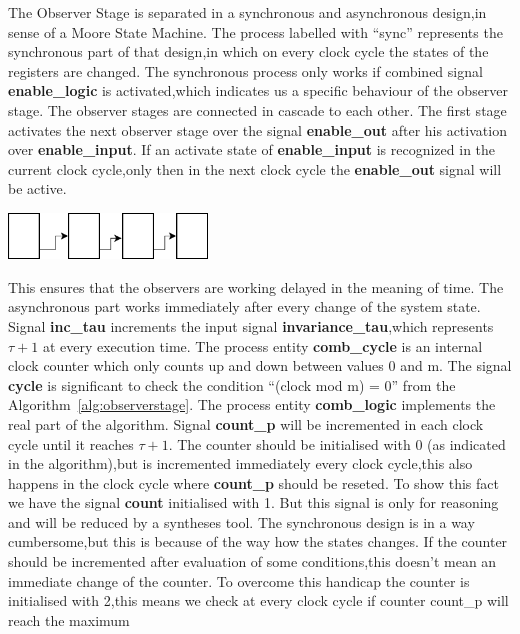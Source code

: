 The Observer Stage is separated in a synchronous and asynchronous design,in sense of a Moore State Machine.
The process labelled with ``sync'' represents the synchronous part of that design,in which on every clock cycle 
the states of the registers are changed.
The synchronous process only works if combined signal \textbf{enable\_logic} is activated,which indicates us a specific behaviour of the 
observer stage. The observer stages are connected in cascade to each other. The first stage activates the next observer stage over the signal
\textbf{enable\_out} after his activation over \textbf{enable\_input}.
If an activate state of \textbf{enable\_input} is recognized in the current clock cycle,only then in the next clock cycle the \textbf{enable\_out} signal will
be active.   
%
\begin{center}
\includegraphics[width=200px]{Chapter2/Figs/Raster/Diagramm1.png}
\end{center}
This ensures that the observers are working delayed in the meaning of time.
The asynchronous part works immediately after every change of the system state.  
Signal \textbf{inc\_tau} increments the input signal \textbf{invariance\_tau},which represents $\tau+1$ at every execution time.
The process entity \textbf{comb\_cycle} is an internal clock counter which only counts up and down between values 0 and m.
The signal \textbf{cycle} is significant to check the condition ``(clock mod m) = 0'' from the Algorithm~\ref{alg:observerstage}.
The process entity \textbf{comb\_logic} implements the real part of the algorithm.
Signal \textbf{count\_p} will be incremented in each clock cycle until it reaches $\tau+1$.
The counter should be initialised with 0 (as indicated in the algorithm),but is incremented immediately every clock cycle,this also happens in the clock cycle where \textbf{count\_p}
should be reseted.
To show this fact we have the signal \textbf{count} initialised with 1. But this signal is only for reasoning and will be reduced by a syntheses tool.  
The synchronous design is in a way cumbersome,but this is because of the way how the states changes.
If the counter should be incremented after evaluation of some conditions,this doesn't mean an immediate change of the counter.
To overcome this handicap the counter is initialised with 2,this means we check at every clock cycle if counter count\_p will reach the maximum
